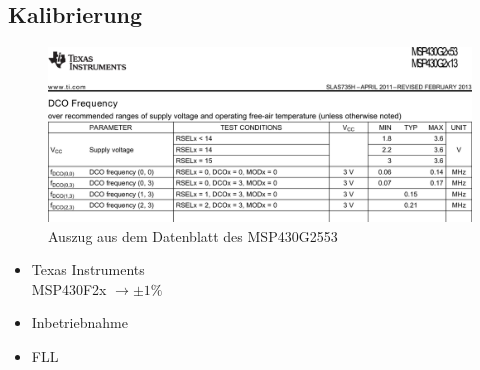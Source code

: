 \subsection{Kalibrierung}
\begin{frame}
  \begin{figure}
    \includegraphics[width=1.0\columnwidth]{fig/ti_ds_dco_freq.pdf}
    \caption{Auszug aus dem Datenblatt des MSP430G2553}
  \end{figure}
\end{frame}
\begin{frame}
  \begin{itemize}
    \item Texas Instruments \pause \\
      MSP430F2x $\rightarrow \pm 1 \%$ \pause \\
    \item Inbetriebnahme \pause
    \item FLL
  \end{itemize}
\end{frame}